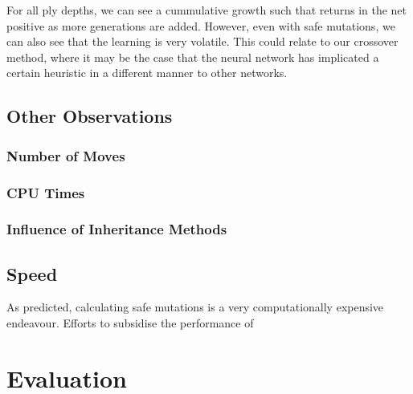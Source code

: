 \documentclass[12pt,a4paper]{article}
\begin{document}
    For all ply depths, we can see a cummulative growth such that returns in the net positive as more generations are added. However, even with safe mutations, we can also see that the learning is very volatile. This could relate to our crossover method, where it may be the case that the neural network has implicated a certain heuristic in a different manner to other networks. 
    
    \subsection{Other Observations}
        \subsubsection{Number of Moves}
        \subsubsection{CPU Times}
        \subsubsection{Influence of Inheritance Methods}
    \subsection{Speed}
    
    As predicted, calculating safe mutations is a very computationally expensive endeavour. Efforts to subsidise the performance of 






\section{Evaluation}
 
    
\end{document}
